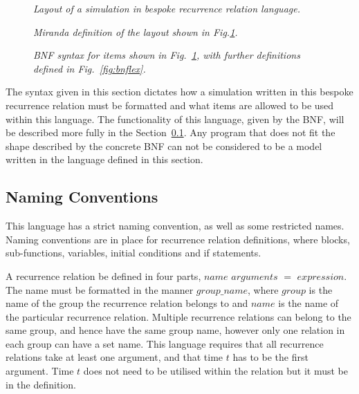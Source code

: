 \documentclass{article}
\begin{document}
\begin{figure}[H]
	\centering
	
	\caption{\it Layout of a simulation in bespoke recurrence relation language.}
	\label{fig:befroemira}
\end{figure} 

\begin{figure}[H]
	\centering
	
	\caption{\it Miranda definition of the layout shown in Fig.\ref{fig:befroemira}.}
	\label{fig:miramean}
\end{figure} 

\begin{figure}[H]
	\centering
	
	\caption{\it BNF syntax for items shown in Fig.~\ref{fig:befroemira}, with further definitions defined in Fig.~\ref{fig:bnflex}.}
	\label{fig:structuredefs}
\end{figure} 

The syntax given in this section dictates how a simulation written in this bespoke recurrence relation must be formatted and what items are allowed to be used within this language. The functionality of this language, given by the BNF, will be described more fully in the Section~\ref{nameconv}. Any program that does not fit the shape described by the concrete BNF can not be considered to be a model written in the language defined in this section.  



\subsection{Naming Conventions} \label{nameconv}
This language has a strict naming convention, as well as some restricted names. Naming conventions are in place for recurrence relation definitions, where blocks, sub-functions, variables, initial conditions and  if statements. 

A recurrence relation be defined in four parts, $name$ $arguments$ $=$ $expression$. The name must be formatted in the manner $group\_name$, where $group$ is the name of the group the recurrence relation belongs to and $name$ is the name of the particular recurrence relation. Multiple recurrence relations can belong to the same group, and hence have the same group name, however only one relation in each group can have a set name. This language requires that all recurrence relations take at least one argument, and that time $t$ has to be the first argument. Time $t$ does not need to be utilised within the relation but it must be in the definition.     
\end{document}
